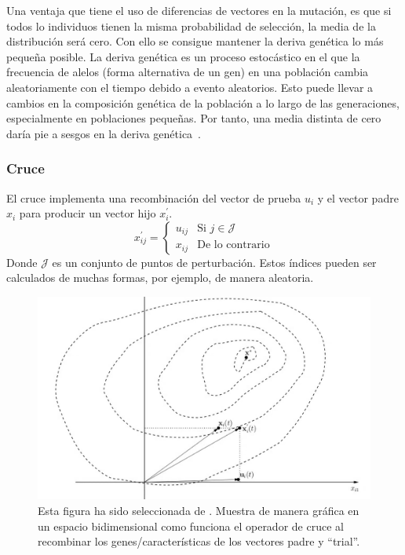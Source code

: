 Una ventaja que tiene el uso de diferencias de vectores en la mutación, es que si todos lo individuos tienen la misma probabilidad de selección, la media de la distribución será cero. Con ello se consigue mantener la deriva genética lo más pequeña posible. La deriva genética es un proceso estocástico en el que la frecuencia de alelos (forma alternativa de un gen) en una población cambia aleatoriamente con el tiempo debido a evento aleatorios. Esto puede llevar a cambios en la composición genética de la población a lo largo de las generaciones, especialmente en poblaciones pequeñas. Por tanto, una media distinta de cero daría pie a sesgos en la deriva genética~\cite{genetic-drift, 10.5555/1557464}.

\subsubsection{Cruce}
El cruce implementa una recombinación del vector de prueba $u_i$ y el vector padre $x_i$ para producir un vector hijo $x^\prime_i$.
\begin{equation}
    x^\prime_{ij}=\begin{cases} u_{ij} & \text{Si $j\in \mathcal{J}$} \\ x_{ij} & \text{De lo contrario} \end{cases}
\end{equation}
Donde $\mathcal{J}$ es un conjunto de puntos de perturbación. Estos índices pueden ser calculados de muchas formas, por ejemplo, de manera aleatoria.

\begin{figure}[H]
    \begin{center}
        \includegraphics[width=1\textwidth]{imagenes/de-crossover.png}
    \end{center}
    \caption[Crossover en DE]{Esta figura ha sido seleccionada de \cite{10.5555/1557464}. Muestra de manera gráfica en un espacio bidimensional como funciona el operador de cruce al recombinar los genes/características de los vectores padre y ``trial''.}
\end{figure}

